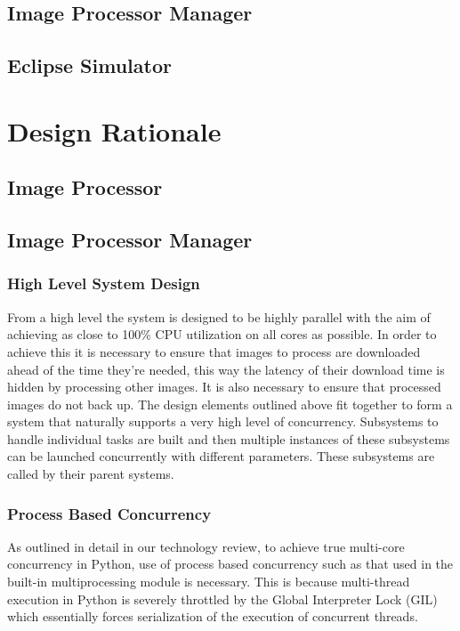 \documentclass[10pt, onecolumn, draftclsnofoot, letterpaper, compsoc]{IEEEtran}
\begin{document}
\subsection{Image Processor Manager}

\subsection{Eclipse Simulator}


\section{Design Rationale}

\subsection{Image Processor}

\subsection{Image Processor Manager}

    \subsubsection{High Level System Design}
    From a high level the system is designed to be highly parallel with the aim of achieving as close to 
    100\% CPU utilization on all cores as possible. In order to achieve this it is necessary to ensure that 
    images to process are downloaded ahead of the time they're needed, this way the latency of their download 
    time is hidden by processing other images. It is also necessary to ensure that processed images do not back 
    up. The design elements outlined above fit together to form a system that naturally supports a very high 
    level of concurrency. Subsystems to handle individual tasks are built and then multiple instances of these 
    subsystems can be launched concurrently with different parameters. These subsystems are called by their 
    parent systems. \\

    \subsubsection{Process Based Concurrency}
    As outlined in detail in our technology review, to achieve true multi-core concurrency in Python, use of 
    process based concurrency such as that used in the built-in multiprocessing module is necessary. This is 
    because multi-thread execution in Python is severely throttled by the Global Interpreter Lock (GIL) which 
    essentially forces serialization of the execution of concurrent threads. \\
\end{document}
